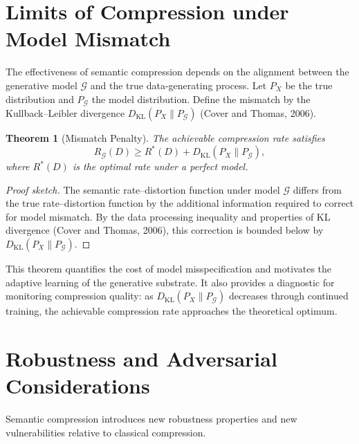 \documentclass[11pt,a4paper]{article}
\newtheorem{theorem}{Theorem}[section]
\theoremstyle{definition}
\theoremstyle{remark}
\begin{document}
\section{Limits of Compression under Model Mismatch}
\label{sec:mismatch}

The effectiveness of semantic compression depends on the alignment between the generative model $\mathcal{G}$ and the true data-generating process. Let $P_X$ be the true distribution and $P_{\mathcal{G}}$ the model distribution. Define the mismatch by the Kullback--Leibler divergence $D_{\mathrm{KL}}(P_X \| P_{\mathcal{G}})$ (Cover and Thomas, 2006).

\begin{theorem}[Mismatch Penalty]
The achievable compression rate satisfies
\[
R_{\mathcal{G}}(D) \ge R^*(D) + D_{\mathrm{KL}}(P_X \| P_{\mathcal{G}}),
\]
where $R^*(D)$ is the optimal rate under a perfect model.
\end{theorem}

\begin{proof}[Proof sketch]
The semantic rate--distortion function under model $\mathcal{G}$ differs from the true rate--distortion function by the additional information required to correct for model mismatch. By the data processing inequality and properties of KL divergence (Cover and Thomas, 2006), this correction is bounded below by $D_{\mathrm{KL}}(P_X \| P_{\mathcal{G}})$.
\end{proof}

This theorem quantifies the cost of model misspecification and motivates the adaptive learning of the generative substrate. It also provides a diagnostic for monitoring compression quality: as $D_{\mathrm{KL}}(P_X \| P_{\mathcal{G}})$ decreases through continued training, the achievable compression rate approaches the theoretical optimum.

\section{Robustness and Adversarial Considerations}
\label{sec:robustness}

Semantic compression introduces new robustness properties and new vulnerabilities relative to classical compression.
\end{document}
